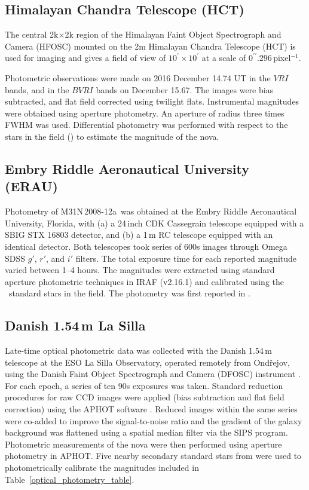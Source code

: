 \documentclass[twocolumn,tighten]{aastex6}
\def\nova{{M31N\,2008-12a~}}
\newcommand{\othreek}{\citetalias{2016ApJ...833..149D}}
\begin{document}
\subsection{Himalayan Chandra Telescope (HCT)}

The central 2k$\times$2k region of the Himalayan Faint Object Spectrograph and Camera (HFOSC) mounted on the 2m Himalayan Chandra Telescope (HCT) is used for imaging and gives a field of view of $10^\prime\times10^\prime$ at a scale of $0^{\prime\prime}\!\!.296$\,pixel$^{-1}$.

Photometric observations were made on 2016 December 14.74 UT in the $VRI$ bands, and in the $BVRI$ bands on December 15.67. The images were bias subtracted, and flat field corrected using twilight flats. Instrumental magnitudes were obtained using aperture photometry. An aperture of radius three times FWHM was used. Differential photometry was performed with respect to the stars in the field (\othreek) to estimate the magnitude of the nova. 

\subsection{Embry Riddle Aeronautical University (ERAU)}

Photometry of \nova was obtained at the Embry Riddle Aeronautical University, Florida, with (a) a 24\,inch CDK Cassegrain telescope equipped with a SBIG STX 16803 detector, and (b) a 1\,m RC telescope equipped with an identical detector.  Both telescopes took series of 600s images through Omega SDSS $g'$, $r'$, and $i'$ filters. The total exposure time for each reported magnitude varied between 1--4 hours. The magnitudes were extracted using standard aperture photometric techniques in IRAF (v2.16.1) and calibrated using the \othreek\ standard stars in the field. The photometry was first reported in \citet{2016ATel.9857....1E,2016ATel.9861....1B, 2016ATel.9881....1K}.


\subsection{Danish 1.54\,m La Silla}

Late-time optical photometric data was collected with the Danish 1.54\,m telescope at the ESO La Silla Observatory, operated remotely from Ond\v{r}ejov, using the Danish Faint Object Spectrograph and Camera (DFOSC) instrument \citep{2016ATel.9883....1H}. For each epoch, a series of ten 90s exposures was taken. Standard reduction procedures for raw CCD images were applied (bias subtraction and flat field correction) using the APHOT software \citep{1994ExA.....5..375P}. Reduced images within the same series were co-added to improve the signal-to-noise ratio and the gradient of the galaxy background was flattened using a spatial median filter via the SIPS program. Photometric measurements of the nova were then performed using aperture photometry in APHOT. Five nearby secondary standard stars from \citep{2006AJ....131.2478M} were used to photometrically calibrate the magnitudes included in Table~\ref{optical_photometry_table}. 
\end{document}
